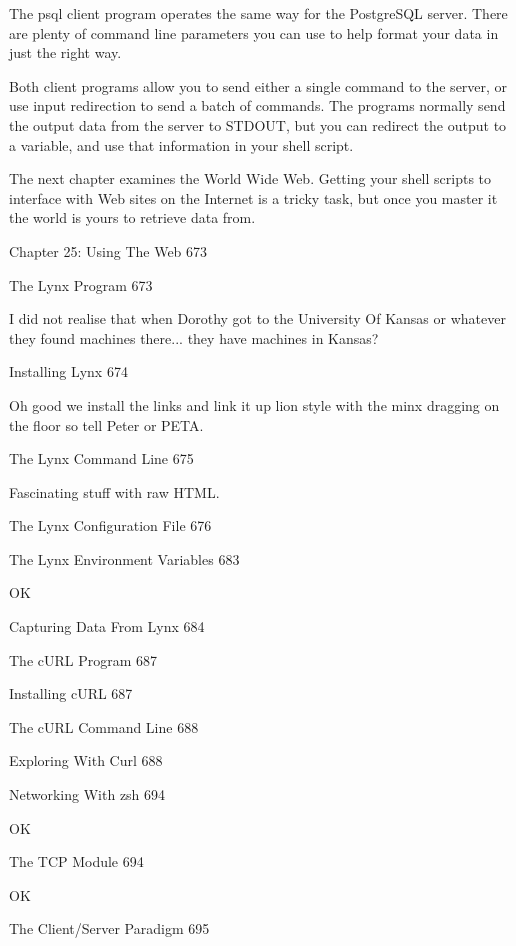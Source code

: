 The psql client program operates the same way for the PostgreSQL server. There are plenty of command line parameters you can use to help format your data in just the right way.

Both client programs allow you to send either a single command to the server, or use input redirection to send a batch of commands. The programs normally send the output data from the server to STDOUT, but you can redirect the output to a variable, and use that information in your shell script.

The next chapter examines the World Wide Web. Getting your shell scripts to interface with Web sites on the Internet is a tricky task, but once you master it the world is yours to retrieve data from.

Chapter 25: Using The Web 673



The Lynx Program 673

I did not realise that when Dorothy got to the University Of Kansas or whatever they found machines there... they have machines in Kansas?

Installing Lynx 674

Oh good we install the links and link it up lion style with the minx dragging on the floor so tell Peter or PETA.

The Lynx Command Line 675

Fascinating stuff with raw HTML.

The Lynx Configuration File 676



The Lynx Environment Variables 683

OK

Capturing Data From Lynx 684



The cURL Program 687



Installing cURL 687



The cURL Command Line 688



Exploring With Curl 688



Networking With zsh 694

OK

The TCP Module 694

OK

The Client/Server Paradigm 695



